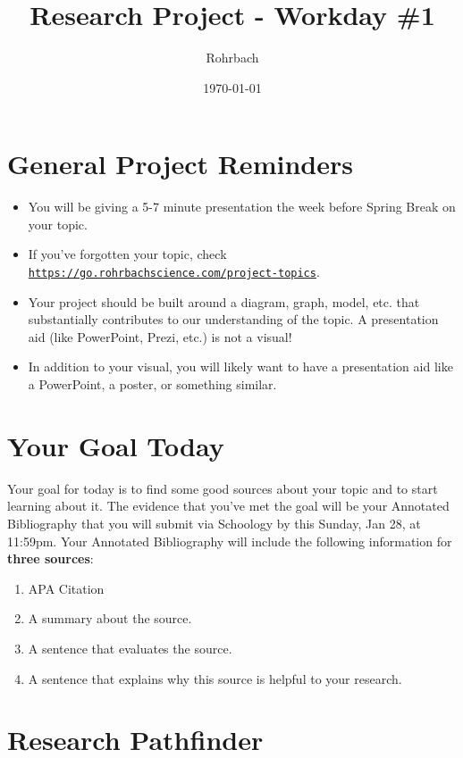 \documentclass[10pt]{exam}
\title{Research Project - Workday \#1}
\author{Rohrbach}
\date{\today}
\begin{document}
\maketitle

\section*{General Project Reminders}

\begin{itemize}
  \item 
    You will be giving a 5-7 minute presentation the week before Spring Break on your topic.
  \item 
    If you've forgotten your topic, check \texttt{\href{https://go.rohrbachscience.com/project-topics}{https://go.rohrbachscience.com/project-topics}}.
  \item	
    Your project should be built around a diagram, graph, model, etc. that substantially contributes to our understanding of the topic.  A presentation aid (like PowerPoint, Prezi, etc.) is not a visual!
  \item
    In addition to your visual, you will likely want to have a presentation aid like a PowerPoint, a poster, or something similar.
  
\end{itemize}

\section*{Your Goal Today}

Your goal for today is to find some good sources about your topic and to start learning about it.  The evidence that you've met the goal will be your Annotated Bibliography that you will submit via Schoology by this Sunday, Jan 28, at 11:59pm.  Your Annotated Bibliography will include the following information for {\bf three sources}:
%
\begin{enumerate}
  \item APA Citation 
  \item A summary about the source.
  \item A sentence that evaluates the source.
  \item A sentence that explains why this source is helpful to your research. 
\end{enumerate}


\section*{Research Pathfinder}
\end{document}
